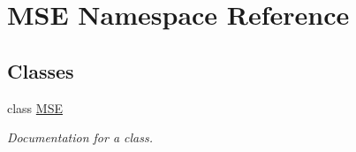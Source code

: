 \hypertarget{namespace_m_s_e}{}\section{M\+SE Namespace Reference}
\label{namespace_m_s_e}
\subsection*{Classes}
\begin{DoxyCompactItemize}
\item 
class \mbox{\hyperlink{class_m_s_e_1_1_m_s_e}{M\+SE}}
\begin{DoxyCompactList}\small\item\em Documentation for a class. \end{DoxyCompactList}\end{DoxyCompactItemize}
